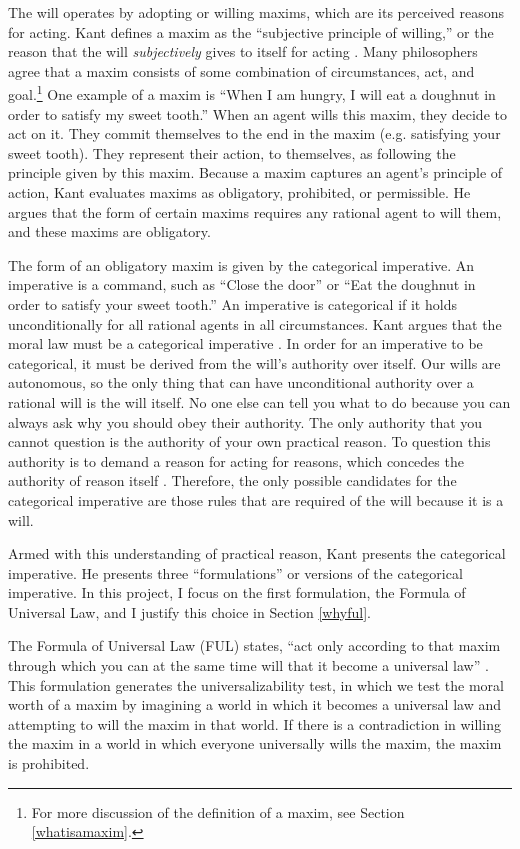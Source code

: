 \begin{isabellebody}
\begin{isamarkuptext}
The will operates by adopting or willing maxims, which are its perceived reasons for acting. Kant defines a maxim as 
the ``subjective principle of willing,'' or the reason that the will \emph{subjectively} gives 
to itself for acting \citep[16 footnote 1]{groundwork}. Many philosophers agree that a maxim consists 
of some combination of circumstances, 
act, and goal.\footnote{For more discussion of the definition of a maxim, see Section \ref{whatisamaxim}.}
One example of a maxim is ``When I am hungry, I will eat a doughnut in order to satisfy my sweet tooth.''
When an agent wills this maxim, they decide to act on it. They commit themselves to the end in the maxim 
(e.g. satisfying your sweet tooth). They represent their action, to themselves, as following the 
principle given by this maxim. Because a maxim captures an agent's principle of action, Kant evaluates
maxims as obligatory, prohibited, or permissible. He argues that the form of certain maxims 
requires any rational agent to will them, and these maxims are obligatory. 

The form of an obligatory maxim is given by the categorical imperative. 
An imperative is a command, such as ``Close the door'' or ``Eat the doughnut in order to satisfy your 
sweet tooth.'' An imperative is categorical if it holds unconditionally for all rational agents in all 
circumstances. Kant argues that the moral law must be a categorical imperative \citep[5]{groundwork}. 
In order for an imperative to be categorical, it must be derived from the will's authority over itself. 
Our wills are autonomous, so the only thing that can have unconditional authority over a rational will is 
the will itself. No one else can tell you what to do because you can always ask why you 
should obey their authority. The only authority that you cannot question is the authority of your own 
practical reason. To question this authority is to demand a reason for acting for reasons, which 
concedes the authority of reason itself \citep[23]{velleman}. Therefore, the only possible candidates 
for the categorical imperative are those rules that are required of the will because it is a will. 

Armed with this understanding of practical reason, Kant presents the categorical 
imperative. He presents three ``formulations'' or versions of the categorical imperative. In this project, 
I focus on the first formulation, the Formula of Universal Law, and I justify this choice in Section \ref{whyful}.

The Formula of Universal Law (FUL) states, ``act only according to that maxim through which you can 
at the same time will that it become a universal law'' \cite[34]{groundwork}. This formulation
generates the universalizability test, in which we test the moral worth of a maxim by 
imagining a world in which it becomes a universal law and attempting to will the maxim in that world.
If there is a contradiction in willing the maxim in a world in which everyone universally wills the maxim,
the maxim is prohibited. 


\end{isamarkuptext}
\end{isabellebody}
